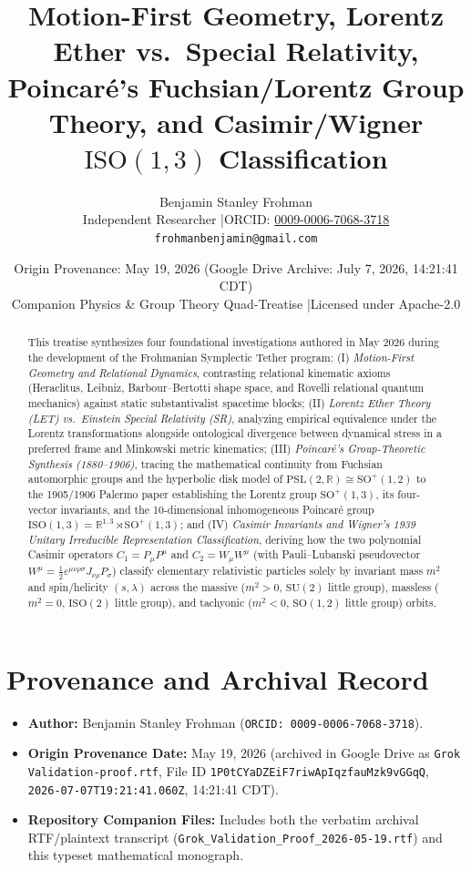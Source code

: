 \documentclass[11pt]{article}
\title{\textbf{Motion-First Geometry, Lorentz Ether vs.\ Special Relativity, Poincar\'e's Fuchsian/Lorentz Group Theory, and Casimir/Wigner $\mathrm{ISO}(1,3)$ Classification}}
\author{Benjamin Stanley Frohman\\
\small Independent Researcher \quad|\quad ORCID: \href{https://orcid.org/0009-0006-7068-3718}{0009-0006-7068-3718}\\
\small \texttt{frohmanbenjamin@gmail.com}}
\date{Origin Provenance: May 19, 2026 (Google Drive Archive: July 7, 2026, 14:21:41 CDT) \\ \small Companion Physics \& Group Theory Quad-Treatise \quad|\quad Licensed under Apache-2.0}
\begin{document}
\maketitle

\begin{abstract}
This treatise synthesizes four foundational investigations authored in May 2026 during the development of the Frohmanian Symplectic Tether program:
(I) \emph{Motion-First Geometry and Relational Dynamics}, contrasting relational kinematic axioms (Heraclitus, Leibniz, Barbour--Bertotti shape space, and Rovelli relational quantum mechanics) against static substantivalist spacetime blocks;
(II) \emph{Lorentz Ether Theory (LET) vs.\ Einstein Special Relativity (SR)}, analyzing empirical equivalence under the Lorentz transformations alongside ontological divergence between dynamical stress in a preferred frame and Minkowski metric kinematics;
(III) \emph{Poincar\'e's Group-Theoretic Synthesis (1880--1906)}, tracing the mathematical continuity from Fuchsian automorphic groups and the hyperbolic disk model of $\mathrm{PSL}(2,\mathbb{R}) \cong \mathrm{SO}^+(1,2)$ to the 1905/1906 Palermo paper establishing the Lorentz group $\mathrm{SO}^+(1,3)$, its four-vector invariants, and the 10-dimensional inhomogeneous Poincar\'e group $\mathrm{ISO}(1,3) = \mathbb{R}^{1,3} \rtimes \mathrm{SO}^+(1,3)$; and
(IV) \emph{Casimir Invariants and Wigner's 1939 Unitary Irreducible Representation Classification}, deriving how the two polynomial Casimir operators $C_1 = P_\mu P^\mu$ and $C_2 = W_\mu W^\mu$ (with Pauli--Lubanski pseudovector $W^\mu = \tfrac{1}{2}\varepsilon^{\mu\nu\rho\sigma} J_{\nu\rho} P_\sigma$) classify elementary relativistic particles solely by invariant mass $m^2$ and spin/helicity $(s,\lambda)$ across the massive ($m^2>0$, $\mathrm{SU}(2)$ little group), massless ($m^2=0$, $\mathrm{ISO}(2)$ little group), and tachyonic ($m^2<0$, $\mathrm{SO}(1,2)$ little group) orbits.
\end{abstract}

\tableofcontents

\section{Provenance and Archival Record}
\begin{itemize}
  \item \textbf{Author:} Benjamin Stanley Frohman (\texttt{ORCID: 0009-0006-7068-3718}).
  \item \textbf{Origin Provenance Date:} May 19, 2026 (archived in Google Drive as \texttt{Grok Validation-proof.rtf}, File ID \texttt{1P0tCYaDZEiF7riwApIqzfauMzk9vGGqQ}, \texttt{2026-07-07T19:21:41.060Z}, 14:21:41 CDT).
  \item \textbf{Repository Companion Files:} Includes both the verbatim archival RTF/plaintext transcript (\texttt{Grok\_Validation\_Proof\_2026-05-19.rtf}) and this typeset mathematical monograph.
\end{itemize}
\end{document}
